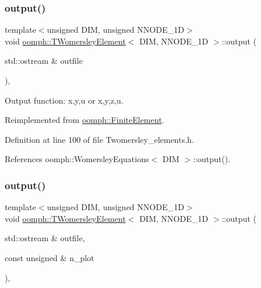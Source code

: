 \subsubsection{\texorpdfstring{output()}{output()}\hspace{0.1cm}{\footnotesize\ttfamily [1/4]}}
{\footnotesize\ttfamily template$<$unsigned D\+IM, unsigned N\+N\+O\+D\+E\+\_\+1D$>$ \\
void \hyperlink{classoomph_1_1TWomersleyElement}{oomph\+::\+T\+Womersley\+Element}$<$ D\+IM, N\+N\+O\+D\+E\+\_\+1D $>$\+::output (\begin{DoxyParamCaption}\item[{std\+::ostream \&}]{outfile }\end{DoxyParamCaption})\hspace{0.3cm}{\ttfamily [inline]}, {\ttfamily [virtual]}}



Output function\+: x,y,u or x,y,z,u. 



Reimplemented from \hyperlink{classoomph_1_1FiniteElement_a2ad98a3d2ef4999f1bef62c0ff13f2a7}{oomph\+::\+Finite\+Element}.



Definition at line 100 of file Twomersley\+\_\+elements.\+h.



References oomph\+::\+Womersley\+Equations$<$ D\+I\+M $>$\+::output().

\mbox{\label{classoomph_1_1TWomersleyElement_a2cb05fae719db7212c14d4952bb542c0}} 
\subsubsection{\texorpdfstring{output()}{output()}\hspace{0.1cm}{\footnotesize\ttfamily [2/4]}}
{\footnotesize\ttfamily template$<$unsigned D\+IM, unsigned N\+N\+O\+D\+E\+\_\+1D$>$ \\
void \hyperlink{classoomph_1_1TWomersleyElement}{oomph\+::\+T\+Womersley\+Element}$<$ D\+IM, N\+N\+O\+D\+E\+\_\+1D $>$\+::output (\begin{DoxyParamCaption}\item[{std\+::ostream \&}]{outfile,  }\item[{const unsigned \&}]{n\+\_\+plot }\end{DoxyParamCaption})\hspace{0.3cm}{\ttfamily [inline]}, {\ttfamily [virtual]}}



